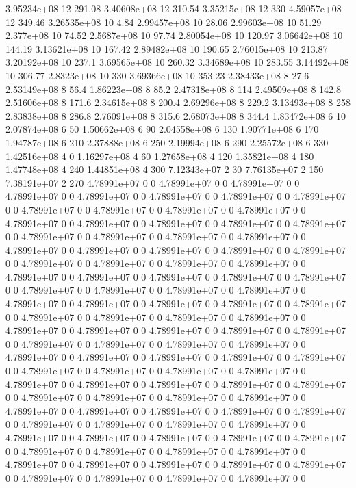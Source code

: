 3.95234e+08 12 291.08
3.40608e+08 12 310.54
3.35215e+08 12 330
4.59057e+08 12 349.46
3.26535e+08 10 4.84
2.99457e+08 10 28.06
2.99603e+08 10 51.29
2.377e+08 10 74.52
2.5687e+08 10 97.74
2.80054e+08 10 120.97
3.06642e+08 10 144.19
3.13621e+08 10 167.42
2.89482e+08 10 190.65
2.76015e+08 10 213.87
3.20192e+08 10 237.1
3.69565e+08 10 260.32
3.34689e+08 10 283.55
3.14492e+08 10 306.77
2.8323e+08 10 330
3.69366e+08 10 353.23
2.38433e+08 8 27.6
2.53149e+08 8 56.4
1.86223e+08 8 85.2
2.47318e+08 8 114
2.49509e+08 8 142.8
2.51606e+08 8 171.6
2.34615e+08 8 200.4
2.69296e+08 8 229.2
3.13493e+08 8 258
2.83838e+08 8 286.8
2.76091e+08 8 315.6
2.68073e+08 8 344.4
1.83472e+08 6 10
2.07874e+08 6 50
1.50662e+08 6 90
2.04558e+08 6 130
1.90771e+08 6 170
1.94787e+08 6 210
2.37888e+08 6 250
2.19994e+08 6 290
2.25572e+08 6 330
1.42516e+08 4 0
1.16297e+08 4 60
1.27658e+08 4 120
1.35821e+08 4 180
1.47748e+08 4 240
1.44851e+08 4 300
7.12343e+07 2 30
7.76135e+07 2 150
7.38191e+07 2 270
4.78991e+07 0 0
4.78991e+07 0 0
4.78991e+07 0 0
4.78991e+07 0 0
4.78991e+07 0 0
4.78991e+07 0 0
4.78991e+07 0 0
4.78991e+07 0 0
4.78991e+07 0 0
4.78991e+07 0 0
4.78991e+07 0 0
4.78991e+07 0 0
4.78991e+07 0 0
4.78991e+07 0 0
4.78991e+07 0 0
4.78991e+07 0 0
4.78991e+07 0 0
4.78991e+07 0 0
4.78991e+07 0 0
4.78991e+07 0 0
4.78991e+07 0 0
4.78991e+07 0 0
4.78991e+07 0 0
4.78991e+07 0 0
4.78991e+07 0 0
4.78991e+07 0 0
4.78991e+07 0 0
4.78991e+07 0 0
4.78991e+07 0 0
4.78991e+07 0 0
4.78991e+07 0 0
4.78991e+07 0 0
4.78991e+07 0 0
4.78991e+07 0 0
4.78991e+07 0 0
4.78991e+07 0 0
4.78991e+07 0 0
4.78991e+07 0 0
4.78991e+07 0 0
4.78991e+07 0 0
4.78991e+07 0 0
4.78991e+07 0 0
4.78991e+07 0 0
4.78991e+07 0 0
4.78991e+07 0 0
4.78991e+07 0 0
4.78991e+07 0 0
4.78991e+07 0 0
4.78991e+07 0 0
4.78991e+07 0 0
4.78991e+07 0 0
4.78991e+07 0 0
4.78991e+07 0 0
4.78991e+07 0 0
4.78991e+07 0 0
4.78991e+07 0 0
4.78991e+07 0 0
4.78991e+07 0 0
4.78991e+07 0 0
4.78991e+07 0 0
4.78991e+07 0 0
4.78991e+07 0 0
4.78991e+07 0 0
4.78991e+07 0 0
4.78991e+07 0 0
4.78991e+07 0 0
4.78991e+07 0 0
4.78991e+07 0 0
4.78991e+07 0 0
4.78991e+07 0 0
4.78991e+07 0 0
4.78991e+07 0 0
4.78991e+07 0 0
4.78991e+07 0 0
4.78991e+07 0 0
4.78991e+07 0 0
4.78991e+07 0 0
4.78991e+07 0 0
4.78991e+07 0 0
4.78991e+07 0 0
4.78991e+07 0 0
4.78991e+07 0 0
4.78991e+07 0 0
4.78991e+07 0 0
4.78991e+07 0 0
4.78991e+07 0 0
4.78991e+07 0 0
4.78991e+07 0 0
4.78991e+07 0 0
4.78991e+07 0 0
4.78991e+07 0 0
4.78991e+07 0 0
4.78991e+07 0 0
4.78991e+07 0 0
4.78991e+07 0 0
4.78991e+07 0 0
4.78991e+07 0 0
4.78991e+07 0 0
4.78991e+07 0 0
4.78991e+07 0 0
4.78991e+07 0 0
4.78991e+07 0 0
